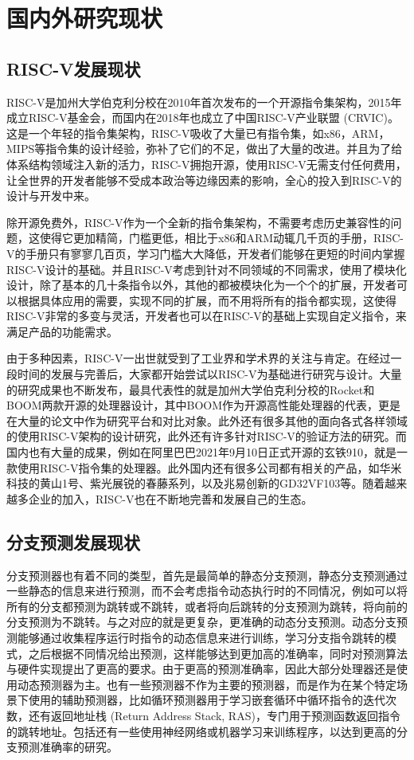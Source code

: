 \section{国内外研究现状}


\subsection{RISC-V发展现状}
RISC-V是加州大学伯克利分校在2010年首次发布的一个开源指令集架构，2015年成立RISC-V基金会，而国内在2018年也成立了中国RISC-V产业联盟 (CRVIC)。这是一个年轻的指令集架构，RISC-V吸收了大量已有指令集，如x86，ARM，MIPS等指令集的设计经验，弥补了它们的不足，做出了大量的改进。并且为了给体系结构领域注入新的活力，RISC-V拥抱开源，使用RISC-V无需支付任何费用，让全世界的开发者能够不受成本政治等边缘因素的影响，全心的投入到RISC-V的设计与开发中来。

除开源免费外，RISC-V作为一个全新的指令集架构，不需要考虑历史兼容性的问题，这使得它更加精简，门槛更低，相比于x86和ARM动辄几千页的手册，RISC-V的手册只有寥寥几百页，学习门槛大大降低，开发者们能够在更短的时间内掌握RISC-V设计的基础。并且RISC-V考虑到针对不同领域的不同需求，使用了模块化设计，除了基本的几十条指令以外，其他的都被模块化为一个个的扩展，开发者可以根据具体应用的需要，实现不同的扩展，而不用将所有的指令都实现，这使得RISC-V非常的多变与灵活，开发者也可以在RISC-V的基础上实现自定义指令，来满足产品的功能需求。

由于多种因素，RISC-V一出世就受到了工业界和学术界的关注与肯定。在经过一段时间的发展与完善后，大家都开始尝试以RISC-V为基础进行研究与设计。大量的研究成果也不断发布，最具代表性的就是加州大学伯克利分校的Rocket\cite{rocket}和BOOM两款开源的处理器设计，其中BOOM作为开源高性能处理器的代表，更是在大量的论文中作为研究平台和对比对象。此外还有很多其他的面向各式各样领域的使用RISC-V架构的设计研究\cite{virtex7, risc-v2, yolo}，此外还有许多针对RISC-V的验证方法的研究\cite{random, sbst, pluggy}。而国内也有大量的成果，例如在阿里巴巴2021年9月10日正式开源的玄铁910，就是一款使用RISC-V指令集的处理器。此外国内还有很多公司都有相关的产品，如华米科技的黄山1号、紫光展锐的春藤系列，以及兆易创新的GD32VF103等。随着越来越多企业的加入，RISC-V也在不断地完善和发展自己的生态。

\subsection{分支预测发展现状}

分支预测器也有着不同的类型，首先是最简单的静态分支预测，静态分支预测通过一些静态的信息来进行预测，而不会考虑指令动态执行时的不同情况，例如可以将所有的分支都预测为跳转或不跳转\cite{branch-98}，或者将向后跳转的分支预测为跳转，将向前的分支预测为不跳转。与之对应的就是更复杂，更准确的动态分支预测。动态分支预测能够通过收集程序运行时指令的动态信息来进行训练，学习分支指令跳转的模式，之后根据不同情况给出预测，这样能够达到更加高的准确率，同时对预测算法与硬件实现提出了更高的要求。由于更高的预测准确率，因此大部分处理器还是使用动态预测器为主。也有一些预测器不作为主要的预测器，而是作为在某个特定场景下使用的辅助预测器，比如循环预测器用于学习嵌套循环中循环指令的迭代次数，还有返回地址栈 (Return Address Stack, RAS)，专门用于预测函数返回指令的跳转地址。包括还有一些使用神经网络或机器学习来训练程序，以达到更高的分支预测准确率的研究\cite{branch-neural,branch-not-resolved,fast-neural-branch}。

